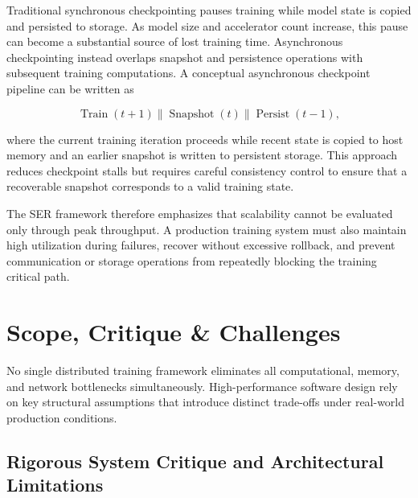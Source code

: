 \documentclass[11pt,journal,final, onecolumn]{IEEEtran}
\begin{document}
Traditional synchronous checkpointing pauses training while model state is
copied and persisted to storage. As model size and accelerator count increase,
this pause can become a substantial source of lost training time.
Asynchronous checkpointing instead overlaps snapshot and persistence
operations with subsequent training computations. A conceptual asynchronous
checkpoint pipeline can be written as

\begin{equation}
    \operatorname{Train}(t+1)
    \parallel
    \operatorname{Snapshot}(t)
    \parallel
    \operatorname{Persist}(t-1),
    \label{eq:asynchronous-checkpoint-pipeline}
\end{equation}

where the current training iteration proceeds while recent state is copied to
host memory and an earlier snapshot is written to persistent storage. This
approach reduces checkpoint stalls but requires careful consistency control to
ensure that a recoverable snapshot corresponds to a valid training state.

The SER framework therefore emphasizes that scalability cannot be evaluated
only through peak throughput. A production training system must also maintain
high utilization during failures, recover without excessive rollback, and
prevent communication or storage operations from repeatedly blocking the
training critical path.

\section{Scope, Critique \& Challenges}
No single distributed training framework eliminates all computational, memory, and network bottlenecks simultaneously. High-performance software design rely on key structural assumptions that introduce distinct trade-offs under real-world production conditions.

\subsection{Rigorous System Critique and Architectural Limitations}
\end{document}
